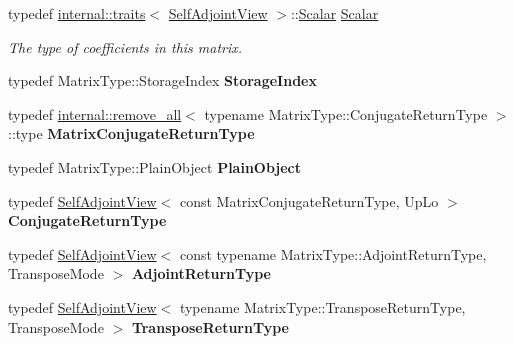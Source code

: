 \begin{DoxyCompactItemize}
typedef \mbox{\hyperlink{struct_eigen_1_1internal_1_1traits}{internal\+::traits}}$<$ \mbox{\hyperlink{class_eigen_1_1_self_adjoint_view}{Self\+Adjoint\+View}} $>$\+::\mbox{\hyperlink{class_eigen_1_1_self_adjoint_view_af52acc0942ece2de9b6db4a99cc6656e}{Scalar}} \mbox{\hyperlink{class_eigen_1_1_self_adjoint_view_af52acc0942ece2de9b6db4a99cc6656e}{Scalar}}
\begin{DoxyCompactList}\small\item\em The type of coefficients in this matrix. \end{DoxyCompactList}\item 
\mbox{\label{class_eigen_1_1_self_adjoint_view_a4cbbdfc1684ad9d8c305116f9e0f45d8}} 
typedef Matrix\+Type\+::\+Storage\+Index {\bfseries Storage\+Index}
\item 
\mbox{\label{class_eigen_1_1_self_adjoint_view_a8153ae731ffa15dfc178f575fb542a6f}} 
typedef \mbox{\hyperlink{struct_eigen_1_1internal_1_1remove__all}{internal\+::remove\+\_\+all}}$<$ typename Matrix\+Type\+::\+Conjugate\+Return\+Type $>$\+::type {\bfseries Matrix\+Conjugate\+Return\+Type}
\item 
\mbox{\label{class_eigen_1_1_self_adjoint_view_af4867e7938d7f7044cc06159ed01528c}} 
typedef Matrix\+Type\+::\+Plain\+Object {\bfseries Plain\+Object}
\item 
\mbox{\label{class_eigen_1_1_self_adjoint_view_aa17703ae1b2a688b2bc167d98a4d7f58}} 
typedef \mbox{\hyperlink{class_eigen_1_1_self_adjoint_view}{Self\+Adjoint\+View}}$<$ const Matrix\+Conjugate\+Return\+Type, Up\+Lo $>$ {\bfseries Conjugate\+Return\+Type}
\item 
\mbox{\label{class_eigen_1_1_self_adjoint_view_aa17738ff0610ef13cb569f8da0871770}} 
typedef \mbox{\hyperlink{class_eigen_1_1_self_adjoint_view}{Self\+Adjoint\+View}}$<$ const typename Matrix\+Type\+::\+Adjoint\+Return\+Type, Transpose\+Mode $>$ {\bfseries Adjoint\+Return\+Type}
\item 
\mbox{\label{class_eigen_1_1_self_adjoint_view_a96d0c17202b034ee2231f26ee6085558}} 
typedef \mbox{\hyperlink{class_eigen_1_1_self_adjoint_view}{Self\+Adjoint\+View}}$<$ typename Matrix\+Type\+::\+Transpose\+Return\+Type, Transpose\+Mode $>$ {\bfseries Transpose\+Return\+Type}

\end{DoxyCompactItemize}
